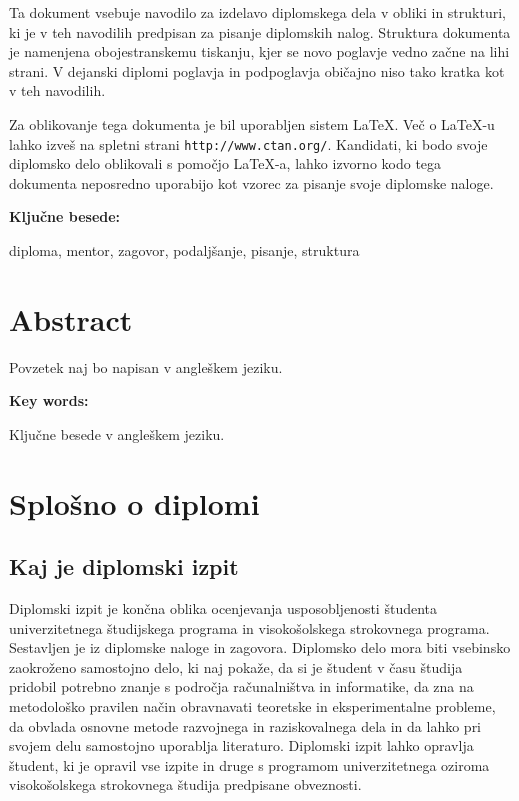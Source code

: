 \documentclass[12pt,a4paper,openany]{book}
\begin{document}
Ta dokument vsebuje navodilo za izdelavo diplomskega dela v obliki in strukturi, ki je v teh navodilih predpisan za
pisanje diplomskih nalog. Struktura dokumenta je namenjena obojestranskemu tiskanju, kjer se novo poglavje vedno za\v cne na lihi strani.
V dejanski diplomi poglavja in podpogla\-vja  obi\v cajno niso tako kratka kot v teh navodilih.

Za oblikovanje tega dokumenta je bil uporabljen sistem \LaTeX.
Ve\v c o \LaTeX-u lahko izve\v s na spletni strani \texttt{http://www.ctan.org/}.
Kandidati, ki bodo svoje diplomsko delo oblikovali s pomo\v cjo
\LaTeX-a, lahko izvorno kodo tega dokumenta neposredno uporabijo kot vzorec za pisanje svoje diplomske naloge.

\vspace{1.3cm}
\noindent
{\large \bf Ključne besede:}

\vspace{0.5cm}
\noindent
diploma, mentor, zagovor, podaljšanje, pisanje, struktura


\chapter*{Abstract}


Povzetek naj bo napisan v angleškem jeziku.

\vspace{1.3cm}
\noindent
{\large \bf Key words:}

\vspace{0.5cm}
\noindent
Ključne besede v angleškem jeziku.



\chapter{Splošno o diplomi}

\section{Kaj je diplomski izpit}
Diplomski izpit je končna oblika ocenjevanja usposobljenosti študenta univerzitetnega študijskega programa in visokošolskega
strokovnega programa. Sestavljen je iz diplomske naloge in zagovora. Diplomsko delo mora biti vsebinsko zaokroženo samostojno delo, ki naj
pokaže, da si je študent v času študija pridobil potrebno znanje s področja računalništva in informatike, da zna na metodološko pravilen način
obravnavati teoretske in eksperimentalne probleme, da obvlada osnovne metode razvojnega in raziskovalnega dela in da lahko pri svojem delu
samostojno uporablja literaturo. Diplomski izpit lahko opravlja študent, ki je opravil vse izpite in druge s programom univerzitetnega oziroma
visokošolskega strokovnega študija predpisane obveznosti. 
\end{document}
